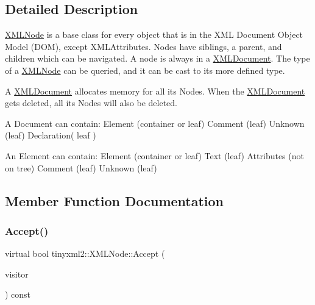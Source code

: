 \subsection{Detailed Description}
\hyperlink{classtinyxml2_1_1XMLNode}{X\+M\+L\+Node} is a base class for every object that is in the X\+ML Document Object Model (D\+OM), except X\+M\+L\+Attributes. Nodes have siblings, a parent, and children which can be navigated. A node is always in a \hyperlink{classtinyxml2_1_1XMLDocument}{X\+M\+L\+Document}. The type of a \hyperlink{classtinyxml2_1_1XMLNode}{X\+M\+L\+Node} can be queried, and it can be cast to its more defined type.

A \hyperlink{classtinyxml2_1_1XMLDocument}{X\+M\+L\+Document} allocates memory for all its Nodes. When the \hyperlink{classtinyxml2_1_1XMLDocument}{X\+M\+L\+Document} gets deleted, all its Nodes will also be deleted.

\begin{DoxyVerb}A Document can contain: Element (container or leaf)
                        Comment (leaf)
                        Unknown (leaf)
                        Declaration( leaf )

An Element can contain: Element (container or leaf)
                        Text    (leaf)
                        Attributes (not on tree)
                        Comment (leaf)
                        Unknown (leaf)\end{DoxyVerb}
 

\subsection{Member Function Documentation}
\mbox{\label{classtinyxml2_1_1XMLNode_a81e66df0a44c67a7af17f3b77a152785}} 
\subsubsection{\texorpdfstring{Accept()}{Accept()}\hspace{0.1cm}{\footnotesize\ttfamily [1/2]}}
{\footnotesize\ttfamily virtual bool tinyxml2\+::\+X\+M\+L\+Node\+::\+Accept (\begin{DoxyParamCaption}\item[{\hyperlink{classtinyxml2_1_1XMLVisitor}{X\+M\+L\+Visitor} $\ast$}]{visitor }\end{DoxyParamCaption}) const\hspace{0.3cm}{\ttfamily [pure virtual]}}

